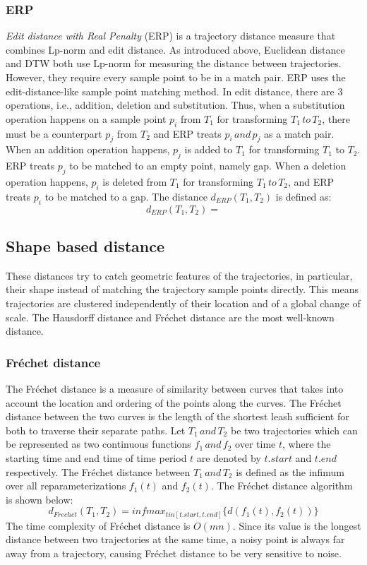 \documentclass[a4paper, 12pt]{article}
\begin{document}
\subsubsection{ERP}
\textit{Edit distance with Real Penalty} (ERP) is a trajectory distance measure that combines Lp-norm and edit distance. As introduced above, Euclidean distance and DTW both use Lp-norm for measuring the distance between trajectories. However, they require every sample point to be in a match pair. ERP uses the edit-distance-like sample point matching method. In edit distance, there are 3 operations, i.e., addition, deletion and substitution. Thus, when a substitution operation happens on a sample point $p_{i}$ from $T_{1}$ for transforming $T_{1}\,to\,T_{2}$, there must be a counterpart $p_{j}$ from $T_{2}$ and ERP treats $p_{i}\,and\,p_{j}$ as a match pair. When an addition operation happens, $p_{j}$ is added to $T_{1}$ for transforming $T_{1}$ to $T_{2}$. ERP treats $p_{j}$ to be matched to an empty point, namely gap. When a deletion operation happens, $p_{i}$ is deleted from $T_{1}$ for transforming $T_{1}\,to\,T_{2}$, and ERP treats $p_{i}$ to be matched to a gap. The distance $d_{ERP}(T_{1},T_{2})$ is defined as:
\begin{equation} \label{eq5}
    d_{ERP}(T_{1},T_{2}) = 
\end{equation}

\subsection{Shape based distance}
These distances try to catch geometric features of the trajectories, in particular, their shape instead of matching the trajectory sample points directly. This means trajectories are clustered independently of their location and of a global change of scale. The Hausdorff distance and Fréchet distance are the most well-known distance.

\subsubsection{Fréchet distance}
The Fréchet distance is a measure of similarity between curves that takes into account the location and ordering of the points along the curves. The Fréchet distance between the two curves is the length of the shortest leash sufficient for both to traverse their separate paths. Let $T_{1}\,and\,T_{2}$ be two trajectories which can be represented as two continuous functions $f_{1}\,and\,f_{2}$ over time $t$, where the starting time and end time of time period $t$ are denoted by $t.start$ and $t.end$ respectively. The Fréchet distance between $T_{1}\,and\,T_{2}$ is defined as the infimum over all reparameterizations $f_{1}(t)$ and $f_{2}(t)$. The Fréchet distance algorithm is shown below:
\begin{equation} \label{eq6}
    d_{Frechet}(T_{1},T_{2}) = infmax_{t in [t.start, t.end]} \{d(f_{1}(t), f_{2}(t))\}
\end{equation}
The time complexity of Fréchet distance is $O(mn)$. Since its value is the longest distance between two trajectories at the same time, a noisy point is always far away from a trajectory, causing Fréchet distance to be very sensitive to noise.
\end{document}
